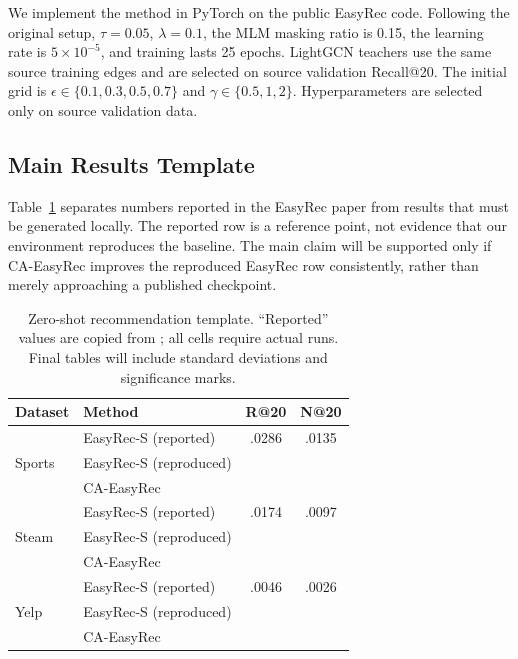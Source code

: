 \documentclass[11pt]{article}
\newcommand{\method}{CA-EasyRec}
\newcommand{\pending}{\textemdash}
\begin{document}
We implement the method in PyTorch \citep{paszke2019pytorch} on the public EasyRec code.
Following the original setup, $\tau=0.05$, $\lambda=0.1$, the MLM masking ratio is 0.15, the learning rate is $5\times10^{-5}$, and training lasts 25 epochs.
LightGCN teachers use the same source training edges and are selected on source validation Recall@20.
The initial grid is $\epsilon\in\{0.1,0.3,0.5,0.7\}$ and $\gamma\in\{0.5,1,2\}$.
Hyperparameters are selected only on source validation data.

\subsection{Main Results Template}

Table~\ref{tab:main} separates numbers reported in the EasyRec paper from results that must be generated locally.
The reported row is a reference point, not evidence that our environment reproduces the baseline.
The main claim will be supported only if \method{} improves the reproduced EasyRec row consistently, rather than merely approaching a published checkpoint.

\begin{table}[t]
\centering
\small
\begin{tabular}{llcc}
\toprule
Dataset & Method & R@20 & N@20 \\
\midrule
\multirow{3}{*}{Sports}
& EasyRec-S (reported) & .0286 & .0135 \\
& EasyRec-S (reproduced) & \pending & \pending \\
& \method{} & \pending & \pending \\
\midrule
\multirow{3}{*}{Steam}
& EasyRec-S (reported) & .0174 & .0097 \\
& EasyRec-S (reproduced) & \pending & \pending \\
& \method{} & \pending & \pending \\
\midrule
\multirow{3}{*}{Yelp}
& EasyRec-S (reported) & .0046 & .0026 \\
& EasyRec-S (reproduced) & \pending & \pending \\
& \method{} & \pending & \pending \\
\bottomrule
\end{tabular}
\caption{Zero-shot recommendation template. ``Reported'' values are copied from \citet{ren-huang-2025-easyrec}; all \pending{} cells require actual runs. Final tables will include standard deviations and significance marks.}
\label{tab:main}
\end{table}
\end{document}
